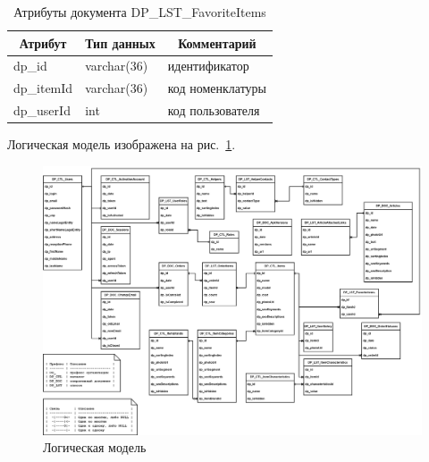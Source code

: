 \begin{table}[p]
    \centering\small

    \caption{Атрибуты документа DP\_LST\_FavoriteItems}
    \label{tab:DP_LST_FavoriteItems}

    \begin{tabular}{|p{5cm}|p{2.5cm}|p{9cm}|}
        \hline
        \multicolumn{1}{|c|}{Атрибут}
        & \multicolumn{1}{c|}{Тип данных}
        & \multicolumn{1}{c|}{Комментарий}
        \\ \hline

        dp\_id & varchar(36) & идентификатор \\ \hline
        dp\_itemId & varchar(36) & код номенклатуры \\ \hline
        dp\_userId & int & код пользователя \\ \hline
    \end{tabular}
\end{table}

Логическая модель изображена на рис.~\ref{fig:db_logic_model}.

\begin{figure}[!p]
    \centering

    \includegraphics[angle=90, width=18cm]
    {images/db/db.png}

    \caption{Логическая модель}

    \label{fig:db_logic_model}
\end{figure}
